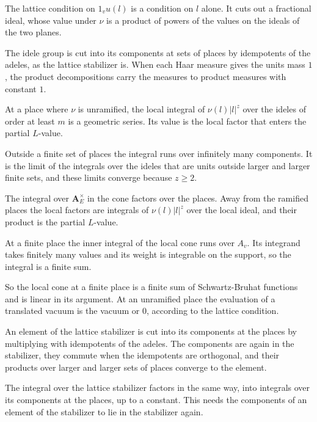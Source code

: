 The lattice condition on $1_vu(l)$ is a condition on $l$ alone. It cuts out a
fractional ideal, whose value under $\nu$ is a product of powers of the values
on the ideals of the two planes.

The idele group is cut into its components at sets of places by idempotents of
the adeles, as the lattice stabilizer is. When each Haar measure gives the units
mass $1$, the product decompositions carry the measures to product measures with
constant $1$.

At a place where $\nu$ is unramified, the local integral of $\nu(l)|l|^z$ over the
ideles of order at least $m$ is a geometric series. Its value is the local factor
that enters the partial $L$-value.

Outside a finite set of places the integral runs over infinitely many components.
It is the limit of the integrals over the ideles that are units outside larger and
larger finite sets, and these limits converge because $z\geq2$.

The integral over $\mathbf A_E^\times$ in the cone factors over the places. Away
from the ramified places the local factors are integrals of $\nu(l)|l|^z$ over
the local ideal, and their product is the partial $L$-value.

At a finite place the inner integral of the local cone runs over $A_v$. Its
integrand takes finitely many values and its weight is integrable on the support,
so the integral is a finite sum.

So the local cone at a finite place is a finite sum of Schwartz-Bruhat
functions and is linear in its argument. At an unramified place the evaluation
of a translated vacuum is the vacuum or $0$, according to the lattice
condition.

An element of the lattice stabilizer is cut into its components at the places by
multiplying with idempotents of the adeles. The components are again in the
stabilizer, they commute when the idempotents are orthogonal, and their products
over larger and larger sets of places converge to the element.

The integral over the lattice stabilizer factors in the same way, into
integrals over its components at the places, up to a constant. This needs the
components of an element of the stabilizer to lie in the stabilizer again.

